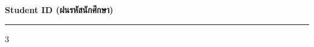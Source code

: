 \documentclass[a4paper, twoside]{article}
\begin{document}
{\begin{center}
        \vspace{0.5cm}
        \textbf{Student ID (ฝนรหัสนักศึกษา)} \\
        \vspace{0.1cm}
    \end{center}
  
    \vspace{0.1cm}
    \hrule

    \setlength{\columnsep}{0.5cm}
    \begin{multicols}{3} 
        \AMCform
    \end{multicols}

} 
\end{document}
